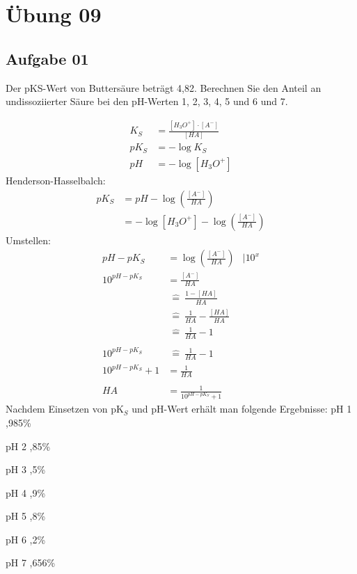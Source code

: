 \documentclass[a4paper,10pt]{article}
\begin{document}
\sidebar
{}
\par \vspace*{5mm}


\section*{Übung 09}

\subsection*{Aufgabe 01}
Der pKS-Wert von Buttersäure beträgt 4,82. Berechnen Sie den Anteil an undissoziierter Säure
bei den pH-Werten 1, 2, 3, 4, 5 und 6 und 7.

\begin{align*}
K_S &= \frac{[H_3O^+] \cdot [A^-]}{[HA]}  \\
pK_S &= -\log K_S \\
pH &= -\log [H_3O^+]
\end{align*}
Henderson-Hasselbalch:
\begin{align*}
pK_S &= pH -\log(\frac{[A^-]}{HA}) \\
 &= -\log [H_3O^+] -\log(\frac{[A^-]}{HA})
\end{align*}
Umstellen:
\begin{align*}
pH - pK_S &= \log(\frac{[A^-]}{HA}) & | 10^x \\
10^{pH - pK_S} &= \frac{[A^-]}{HA} \\
	&~\hat{=}~ \frac{1 - [HA]}{HA} \\
	&~\hat{=}~ \frac{1}{HA} - \frac{[HA]}{HA} \\
	&~\hat{=}~ \frac{1}{HA} - 1 \\
\\
10^{pH - pK_S}	&~\hat{=}~ \frac{1}{HA} - 1 \\
10^{pH - pK_S} +1 &= \frac{1}{HA} \\ \\
HA &= \frac{1}{10^{pH - pK_S} + 1 }
\end{align*}
Nachdem Einsetzen von pK$_S$ und pH-Wert erhält man folgende Ergebnisse: \pp
pH 1 ,985\% \par pH 2 ,85\% \par pH 3 ,5\% \par pH 4 ,9\% \par pH 5 ,8\% \par pH 6 ,2\% \par pH 7 ,656\%
\end{document}

